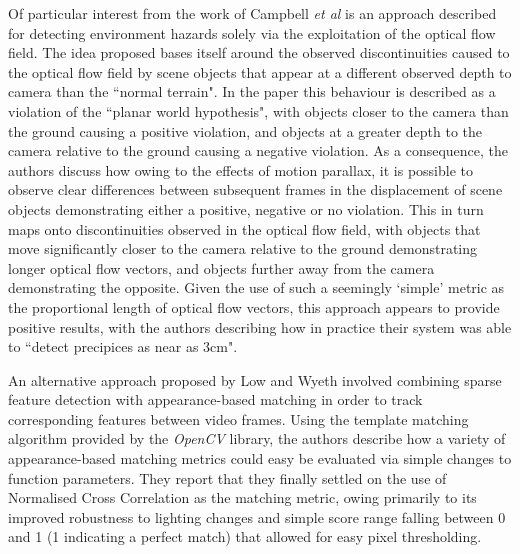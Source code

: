 Of particular interest from the work of Campbell \textit{et al} \cite{campbell} is an approach described for detecting environment hazards solely via the exploitation of the optical flow field. The idea proposed bases itself around the observed discontinuities caused to the optical flow field by scene objects that appear at a different observed depth to camera than the ``normal terrain". In the paper this behaviour is described as a violation of the ``planar world hypothesis", with objects closer to the camera than the ground causing a positive violation, and objects at a greater depth to the camera relative to the ground causing a negative violation. As a consequence, the authors discuss how owing to the effects of motion parallax, it is possible to observe clear differences between subsequent frames in the displacement of scene objects demonstrating either a positive, negative or no violation. This in turn maps onto discontinuities observed in the optical flow field, with objects that move significantly closer to the camera relative to the ground demonstrating longer optical flow vectors, and objects further away from the camera demonstrating the opposite. Given the use of such a seemingly `simple' metric as the proportional length of optical flow vectors, this approach appears to provide positive results, with the authors describing how in practice their system was able to ``detect precipices as near as 3cm". 

An alternative approach proposed by Low and Wyeth \cite{low-wyeth} involved combining sparse feature detection with appearance-based matching in order to track corresponding features between video frames. Using the template matching algorithm provided by the \textit{OpenCV} library, the authors describe how a variety of appearance-based matching metrics could easy be evaluated via simple changes to function parameters. They report that they finally settled on the use of Normalised Cross Correlation as the matching metric, owing primarily to its improved robustness to lighting changes and simple score range falling between 0 and 1 (1 indicating a perfect match) that allowed for easy pixel thresholding.


